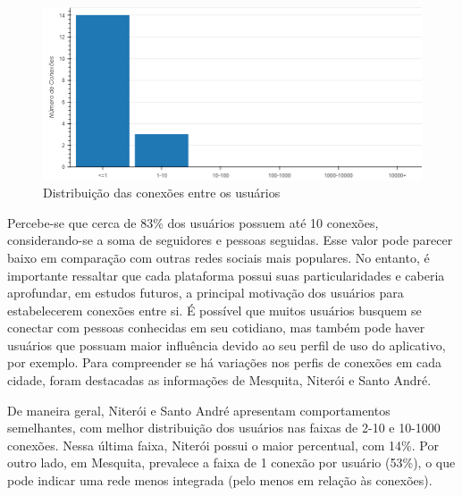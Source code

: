 \begin{figure}[!htb]
	\caption{Distribuição das conexões entre os usuários}
	\label{fig:colab_users_by_connection}
	\centering
	\includegraphics[scale=0.5]{images/colab_users_by_connection.png}
\end{figure}

Percebe-se que cerca de 83\% dos usuários possuem até 10 conexões, considerando-se a soma de seguidores e pessoas seguidas. Esse valor pode parecer baixo em comparação com outras redes sociais mais populares. No entanto, é importante ressaltar que cada plataforma possui suas particularidades e caberia aprofundar, em estudos futuros, a principal motivação dos usuários para estabelecerem conexões entre si. É possível que muitos usuários busquem se conectar com pessoas conhecidas em seu cotidiano, mas também pode haver usuários que possuam maior influência devido ao seu perfil de uso do aplicativo, por exemplo. Para compreender se há variações nos perfis de conexões em cada cidade, foram destacadas as informações de Mesquita, Niterói e Santo André.

De maneira geral, Niterói e Santo André apresentam comportamentos semelhantes, com melhor distribuição dos usuários nas faixas de 2-10 e 10-1000 conexões. Nessa última faixa, Niterói possui o maior percentual, com 14\%. Por outro lado, em Mesquita, prevalece a faixa de 1 conexão por usuário (53\%), o que pode indicar uma rede menos integrada (pelo menos em relação às conexões).

